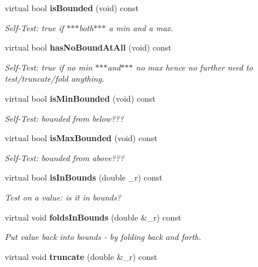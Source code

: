 \begin{CompactItemize}
\item 
virtual bool {\bf is\-Bounded} (void) const \label{classeo_int_below_bound_a7}

\begin{CompactList}\small\item\em Self-Test: true if $\ast$$\ast$$\ast$both$\ast$$\ast$$\ast$ a min and a max. \item\end{CompactList}\item 
virtual bool {\bf has\-No\-Bound\-At\-All} (void) const \label{classeo_int_below_bound_a8}

\begin{CompactList}\small\item\em Self-Test: true if no min $\ast$$\ast$$\ast$and$\ast$$\ast$$\ast$ no max hence no further need to test/truncate/fold anything. \item\end{CompactList}\item 
virtual bool {\bf is\-Min\-Bounded} (void) const \label{classeo_int_below_bound_a9}

\begin{CompactList}\small\item\em Self-Test: bounded from below??? \item\end{CompactList}\item 
virtual bool {\bf is\-Max\-Bounded} (void) const \label{classeo_int_below_bound_a10}

\begin{CompactList}\small\item\em Self-Test: bounded from above??? \item\end{CompactList}\item 
virtual bool {\bf is\-In\-Bounds} (double \_\-r) const \label{classeo_int_below_bound_a11}

\begin{CompactList}\small\item\em Test on a value: is it in bounds? \item\end{CompactList}\item 
virtual void {\bf folds\-In\-Bounds} (double \&\_\-r) const \label{classeo_int_below_bound_a12}

\begin{CompactList}\small\item\em Put value back into bounds - by folding back and forth. \item\end{CompactList}\item 
virtual void {\bf truncate} (double \&\_\-r) const \label{classeo_int_below_bound_a13}


\end{CompactItemize}
